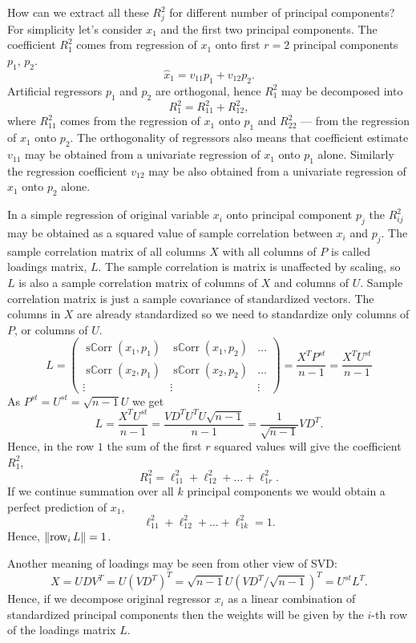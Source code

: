 \documentclass[12pt]{article}
\DeclareMathOperator{\sCorr}{s\mathbb{C}orr}
\DeclareMathOperator{\row}{row}
\DeclarePairedDelimiter{\norm}{\lVert}{\rVert}
\begin{document}
How can we extract all these $R^2_j$ for different number of principal components?
For simplicity let's consider $x_1$ and the first two principal components.
The coefficient $R^2_1$ comes from regression of $x_1$ onto first $r = 2$ principal components $p_1$, $p_2$.
\[
\hat x_1 = v_{11} p_1 + v_{12} p_2.
\]
Artificial regressors $p_1$ and $p_2$ are orthogonal, hence $R^2_1$ may be decomposed into 
\[
R^2_1 = R^2_{11} + R^2_{12},
\]
where $R^2_{11}$ comes from the regression of $x_1$ onto $p_1$ and $R^2_{22}$ — from the regression of $x_1$ onto $p_2$.
The orthogonality of regressors also means that coefficient estimate $v_{11}$ may be obtained from a univariate regression of $x_1$ onto $p_1$ alone. 
Similarly the regression coefficient $v_{12}$ may be also obtained from a univariate regression of $x_1$ onto $p_2$ alone. 

In a simple regression of original variable $x_i$ onto principal component $p_j$ the $R^2_{ij}$ may be obtained as a squared value of sample correlation between $x_i$ and $p_j$.
The sample correlation matrix of all columns $X$ with all columns of $P$ is called loadings matrix, $L$.
The sample correlation is matrix is unaffected by scaling, so $L$ is also a sample correlation matrix of columns of $X$ and columns of $U$.
Sample correlation matrix is just a sample covariance of standardized vectors.
The columns in $X$ are already standardized so we need to standardize only columns of $P$, or columns of $U$.
\[
L = \begin{pmatrix}
    \sCorr(x_1, p_1) & \sCorr(x_1, p_2) & \ldots \\
    \sCorr(x_2, p_1) & \sCorr(x_2, p_2) & \ldots \\
    \vdots & \vdots & \vdots 
\end{pmatrix} = 
\frac{X^T P^{st}}{n - 1} = \frac{X^T U^{st}}{n - 1}
\]
As $P^{st} = U^{st} = \sqrt{n-1} U$ we get
\[
L =  \frac{X^T U^{st}}{n - 1} = \frac{VD^T U^T U\sqrt{n-1}}{n-1} = \frac{1}{\sqrt{n-1}}V D^T.
\]
Hence, in the row $1$ the sum of the first $r$ squared values will give the coefficient $R^2_1$,
\[
R^2_1 = \ell_{11}^2 + \ell_{12}^2 + \dots + \ell_{1r}^2.
\]
If we continue summation over all $k$ principal components we would obtain a perfect prediction of $x_1$,
\[
    \ell_{11}^2 + \ell_{12}^2 + \dots + \ell_{1k}^2 = 1.
\]
Hence, $\norm{\row_i L} = 1$.

Another meaning of loadings may be seen from other view of SVD:
\[
X = U D V^T = U (VD^T)^T = \sqrt{n - 1}U (VD^T / \sqrt{n - 1})^T = U^{st} L^T.
\]
Hence, if we decompose original regressor $x_i$ as a linear combination of standardized 
principal components then the weights will be given by the $i$-th row of the loadings matrix $L$.
\end{document}
